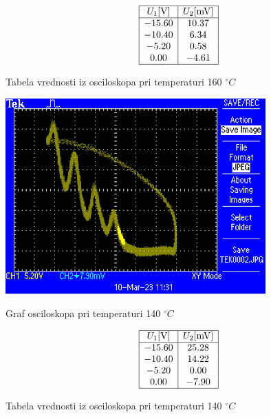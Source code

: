 \documentclass[12pt]{report}
\begin{document}
\begin{tabela}[H]
  \centering
  \[
      \begin{array}{|c|c|c|} \hline
        U_1 [\si{V}] & U_2 [\si{mV}] \\ \hline
        -15.60 &   10.37\\
        -10.40 &    6.34\\
         -5.20 &    0.58\\
           0.00 &  -4.61 \\ \hline
    \end{array}
  \]
  \caption{\small Tabela vrednosti iz osciloskopa pri temperaturi 160 $^\circ C$}
\end{tabela}

\begin{slika}[H]
  \centering
  \includegraphics[width= 0.75\textwidth]{TEK0002}
  \caption{\small Graf osciloskopa pri temperaturi 140 $^\circ C$}
\end{slika}

\begin{tabela}[H]
  \centering
  \[
      \begin{array}{|c|c|c|} \hline
        U_1 [\si{V}] & U_2 [\si{mV}] \\ \hline
        -15.60 &   25.28\\
        -10.40 &   14.22\\
         -5.20 &    0.00\\
           0.00 &  -7.90 \\ \hline
    \end{array}
  \]
  \caption{\small Tabela vrednosti iz osciloskopa pri temperaturi 140 $^\circ C$}
\end{tabela}
\end{document}
